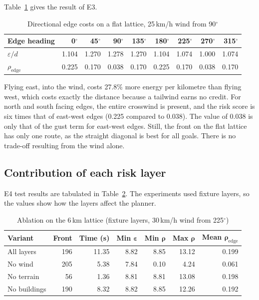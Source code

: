 Table~\ref{tab:dir-edges} gives the result of E3.

\begin{table}[!htbp]
\centering
\caption{Directional edge costs on a flat lattice, 25\,km/h wind from 90$^\circ$}\label{tab:dir-edges}
\small
\begin{tabular}{|l|r|r|r|r|r|r|r|r|}
\hline
\textbf{Edge heading} & 0$^\circ$ & 45$^\circ$ & 90$^\circ$ & 135$^\circ$ & 180$^\circ$ & 225$^\circ$ & 270$^\circ$ & 315$^\circ$\\
\hline
$\varepsilon / d$ & 1.104 & 1.270 & 1.278 & 1.270 & 1.104 & 1.074 & 1.000 & 1.074\\
\hline
$\rho_\mathrm{edge}$ & 0.225 & 0.170 & 0.038 & 0.170 & 0.225 & 0.170 & 0.038 & 0.170\\
\hline
\end{tabular}
\end{table}

Flying east, into the wind, costs 27.8\% more energy per kilometre than flying west,
which costs exactly the distance because a tailwind earns no credit. For north and south
facing edges, the entire crosswind is present, and the risk score is six times that of
east-west edges (0.225 compared to 0.038). The value of 0.038 is only that of the gust
term for east-west edges. Still, the front on the flat lattice has only one route, as the straight diagonal is best for all goals. There is no trade-off resulting from the wind alone.

\subsection{Contribution of each risk layer}\label{sec:perf-ablation}

E4 test results are tabulated in Table~\ref{tab:ablation}. The experiments used fixture layers, so the values show how the layers affect the planner.

\begin{table}[!htbp]
\centering
\caption{Ablation on the 6\,km lattice (fixture layers, 30\,km/h wind from 225$^\circ$)}\label{tab:ablation}
\small
\begin{tabular}{|l|r|r|r|r|r|r|}
\hline
\textbf{Variant} & \textbf{Front} & \textbf{Time (s)} & \textbf{Min $\boldsymbol{\varepsilon}$} & \textbf{Min $\boldsymbol{\rho}$} & \textbf{Max $\boldsymbol{\rho}$} & \textbf{Mean $\boldsymbol{\rho_\mathrm{edge}}$}\\
\hline
All layers & 196 & 11.35 & 8.82 & 8.85 & 13.12 & 0.199\\
\hline
No wind & 205 & 5.38 & 7.84 & 0.10 & 4.24 & 0.061\\
\hline
No terrain & 56 & 1.36 & 8.81 & 8.81 & 13.08 & 0.198\\
\hline
No buildings & 190 & 8.32 & 8.82 & 8.85 & 12.26 & 0.192\\
\hline
\end{tabular}
\end{table}

